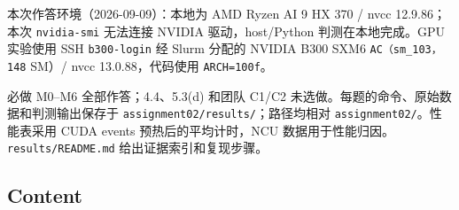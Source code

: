 \documentclass[11pt,a4paper,fontset=fandol]{ctexart}
\begin{document}
\begin{answer}

本次作答环境（2026-09-09）：本地为 AMD Ryzen AI 9 HX 370 / nvcc
12.9.86；本次 \texttt{nvidia-\allowbreak{}smi} 无法连接 NVIDIA
驱动，host/Python 判测在本地完成。GPU 实验使用 SSH
\texttt{b300-\allowbreak{}login} 经 Slurm 分配的 NVIDIA B300 SXM6
\texttt{AC（sm\_\allowbreak{}103，148} SM）/ nvcc 13.0.88，代码使用
\texttt{ARCH=\allowbreak{}100f}。

必做 M0--M6 全部作答；4.4、5.3(d) 和团队 C1/C2
未选做。每题的命令、原始数据和判测输出保存于
\texttt{assignment02/\allowbreak{}results/\allowbreak{}}；路径均相对
\texttt{assignment02/\allowbreak{}}。性能表采用 CUDA events
预热后的平均计时，NCU
数据用于性能归因。\texttt{results/\allowbreak{}README.\allowbreak{}md}
给出证据索引和复现步骤。

\end{answer}

\subsection*{Content}\label{content}
\end{document}
